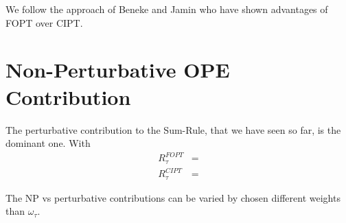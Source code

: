 \documentclass[../../index.tex]{subfiles}
\begin{document}
We follow the approach of Beneke and Jamin \cite{Beneke2008} who have shown
advantages of FOPT over CIPT.


\section{Non-Perturbative OPE Contribution}
The perturbative contribution to the Sum-Rule, that we have seen so far, is the
dominant one. With
\begin{equation}
  \begin{split}
    R_\tau^{FOPT} &= \\ 
    R_\tau^{CIPT} &=  
  \end{split}
\end{equation}

The NP vs perturbative contributions can be varied by chosen different weights
than $\omega_\tau$.
\end{document}
